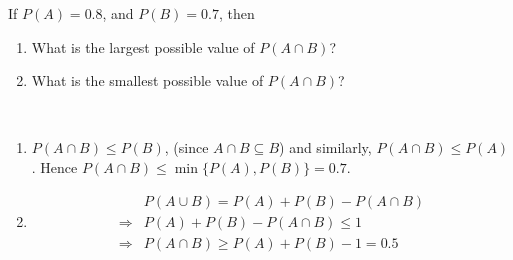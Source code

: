 \begin{example}
    If $P(A) = 0.8$, and $P(B) = 0.7$, then
    \begin{enumerate}[noitemsep,topsep=0pt]
        \item What is the largest possible value of $P(A \cap B)$?
        \item What is the smallest possible value of $P(A \cap B)$?
    \end{enumerate}
\end{example}
\begin{solution} \quad                                                       \\
    \begin{enumerate}[noitemsep,topsep=0pt]
        \item 
        $P(A \cap B) \leq P(B)$, (since $A \cap B \subseteq B$) and similarly, 
        $P(A \cap B) \leq P(A)$. Hence $P(A \cap B) \leq \min{\lbrace P(A),
        P(B) \rbrace} = 0.7$.
        \item
        \begin{align*}
                        & P(A \cup B) = P(A) + P(B) - P(A \cap B)            \\
            \Rightarrow & P(A) + P(B) - P(A \cap B) \leq 1                   \\
            \Rightarrow & P(A \cap B) \geq P(A) + P(B) - 1 = 0.5
        \end{align*}
    \end{enumerate}
\end{solution}

